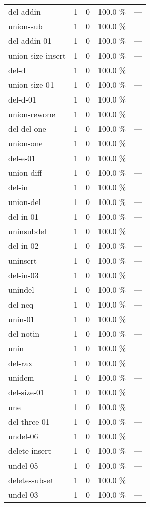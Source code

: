 \documentclass[a4paper]{article}
\begin{document}
\begin{supertabular}{l|r|r|r|r}
del-addin & 1 & 0 & 100.0 \% & ---\\
union-sub & 1 & 0 & 100.0 \% & ---\\
del-addin-01 & 1 & 0 & 100.0 \% & ---\\
union-size-insert & 1 & 0 & 100.0 \% & ---\\
del-d & 1 & 0 & 100.0 \% & ---\\
union-size-01 & 1 & 0 & 100.0 \% & ---\\
del-d-01 & 1 & 0 & 100.0 \% & ---\\
union-rewone & 1 & 0 & 100.0 \% & ---\\
del-del-one & 1 & 0 & 100.0 \% & ---\\
union-one & 1 & 0 & 100.0 \% & ---\\
del-e-01 & 1 & 0 & 100.0 \% & ---\\
union-diff & 1 & 0 & 100.0 \% & ---\\
del-in & 1 & 0 & 100.0 \% & ---\\
union-del & 1 & 0 & 100.0 \% & ---\\
del-in-01 & 1 & 0 & 100.0 \% & ---\\
uninsubdel & 1 & 0 & 100.0 \% & ---\\
del-in-02 & 1 & 0 & 100.0 \% & ---\\
uninsert & 1 & 0 & 100.0 \% & ---\\
del-in-03 & 1 & 0 & 100.0 \% & ---\\
unindel & 1 & 0 & 100.0 \% & ---\\
del-neq & 1 & 0 & 100.0 \% & ---\\
unin-01 & 1 & 0 & 100.0 \% & ---\\
del-notin & 1 & 0 & 100.0 \% & ---\\
unin & 1 & 0 & 100.0 \% & ---\\
del-rax & 1 & 0 & 100.0 \% & ---\\
unidem & 1 & 0 & 100.0 \% & ---\\
del-size-01 & 1 & 0 & 100.0 \% & ---\\
une & 1 & 0 & 100.0 \% & ---\\
del-three-01 & 1 & 0 & 100.0 \% & ---\\
undel-06 & 1 & 0 & 100.0 \% & ---\\
delete-insert & 1 & 0 & 100.0 \% & ---\\
undel-05 & 1 & 0 & 100.0 \% & ---\\
delete-subset & 1 & 0 & 100.0 \% & ---\\
undel-03 & 1 & 0 & 100.0 \% & ---\\

\end{supertabular}
\end{document}
